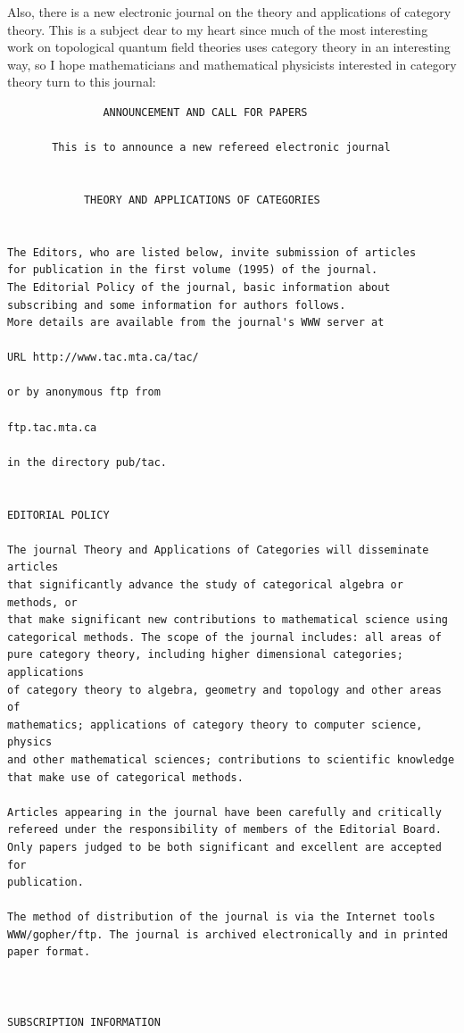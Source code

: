 \documentclass[12pt]{article}
\begin{document}
Also, there is a new electronic journal on the theory and applications
of category theory. This is a subject dear to my heart since much of the
most interesting work on topological quantum field theories uses
category theory in an interesting way, so I hope mathematicians and
mathematical physicists interested in category theory turn to this
journal:

\begin{verbatim}
               ANNOUNCEMENT AND CALL FOR PAPERS
 
       This is to announce a new refereed electronic journal
 
 
            THEORY AND APPLICATIONS OF CATEGORIES
 
 
The Editors, who are listed below, invite submission of articles 
for publication in the first volume (1995) of the journal.   
The Editorial Policy of the journal, basic information about 
subscribing and some information for authors follows. 
More details are available from the journal's WWW server at
 
URL http://www.tac.mta.ca/tac/
 
or by anonymous ftp from
 
ftp.tac.mta.ca
 
in the directory pub/tac.
 
 
EDITORIAL POLICY
 
The journal Theory and Applications of Categories will disseminate articles 
that significantly advance the study of categorical algebra or methods, or 
that make significant new contributions to mathematical science using 
categorical methods. The scope of the journal includes: all areas of 
pure category theory, including higher dimensional categories; applications 
of category theory to algebra, geometry and topology and other areas of 
mathematics; applications of category theory to computer science, physics 
and other mathematical sciences; contributions to scientific knowledge 
that make use of categorical methods.
 
Articles appearing in the journal have been carefully and critically 
refereed under the responsibility of members of the Editorial Board.
Only papers judged to be both significant and excellent are accepted for 
publication. 
 
The method of distribution of the journal is via the Internet tools 
WWW/gopher/ftp. The journal is archived electronically and in printed 
paper format. 
 
 
 
SUBSCRIPTION INFORMATION
 

\end{verbatim}
\end{document}
